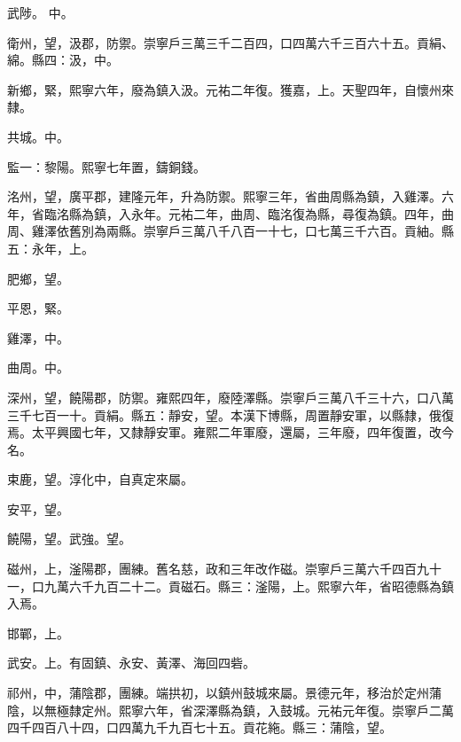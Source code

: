 \begin{pinyinscope}
 武陟。
 中。



 衛州，望，汲郡，防禦。崇寧戶三萬三千二百四，口四萬六千三百六十五。貢絹、綿。縣四：汲，中。



 新鄉，緊，熙寧六年，廢為鎮入汲。元祐二年復。獲嘉，上。天聖四年，自懷州來隸。



 共城。中。



 監一：黎陽。熙寧七年置，鑄銅錢。



 洺州，望，廣平郡，建隆元年，升為防禦。熙寧三年，省曲周縣為鎮，入雞澤。六年，省臨洺縣為鎮，入永年。元祐二年，曲周、臨洺復為縣，尋復為鎮。四年，曲周、雞澤依舊別為兩縣。崇寧戶三萬八千八百一十七，口七萬三千六百。貢紬。縣五：永年，上。



 肥鄉，望。



 平恩，緊。



 雞澤，中。



 曲周。中。



 深州，望，饒陽郡，防禦。雍熙四年，廢陸澤縣。崇寧戶三萬八千三十六，口八萬三千七百一十。貢絹。縣五：靜安，望。本漢下博縣，周置靜安軍，以縣隸，俄復焉。太平興國七年，又隸靜安軍。雍熙二年軍廢，還屬，三年廢，四年復置，改今名。



 束鹿，望。淳化中，自真定來屬。



 安平，望。



 饒陽，望。武強。望。



 磁州，上，滏陽郡，團練。舊名慈，政和三年改作磁。崇寧戶三萬六千四百九十一，口九萬六千九百二十二。貢磁石。縣三：滏陽，上。熙寧六年，省昭德縣為鎮入焉。



 邯鄲，上。



 武安。上。有固鎮、永安、黃澤、海回四砦。



 祁州，中，蒲陰郡，團練。端拱初，以鎮州鼓城來屬。景德元年，移治於定州蒲陰，以無極隸定州。熙寧六年，省深澤縣為鎮，入鼓城。元祐元年復。崇寧戶二萬四千四百八十四，口四萬九千九百七十五。貢花絁。縣三：蒲陰，望。




\end{pinyinscope}
